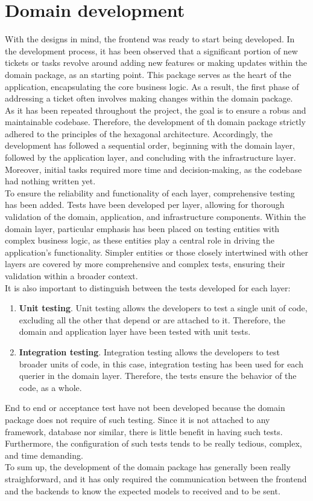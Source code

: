 \documentclass[./memory.tex]{subfiles}
\begin{document}
\section{Domain development}
With the designs in mind, the frontend was ready to start being developed. In
the development process, it has been observed that a significant portion of new
tickets or tasks revolve around adding new features or making updates within the
domain package, as an starting point. This package serves as the heart of the
application, encapsulating the core business logic. As a result, the first phase
of addressing a ticket often involves making changes within the domain package.
\\[8pt]
As it has been repeated throughout the project, the goal is to ensure a robus
and maintainable codebase. Therefore, the development of th domain package
strictly adhered to the principles of the hexagonal architecture. Accordingly,
the development has followed a sequential order, beginning with the domain
layer, followed by the application layer, and concluding with the infrastructure
layer.
\\
Moreover, initial tasks required more time and decision-making, as the
codebase had nothing written yet.
\\[8pt]
To ensure the reliability and functionality of each layer, comprehensive testing
has been added. Tests have been developed per layer, allowing for thorough
validation of the domain, application, and infrastructure components. Within the
domain layer, particular emphasis has been placed on testing entities with
complex business logic, as these entities play a central role in driving the
application's functionality. Simpler entities or those closely intertwined with
other layers are covered by more comprehensive and complex tests, ensuring their
validation within a broader context.
\\
It is also important to distinguish between the tests developed for each layer:
\begin{enumerate}[label = -]
	\item\textbf{Unit testing}. Unit testing allows the developers to test a
	single unit of code, excluding all the other that depend or are attached to
	it. Therefore, the domain and application layer have been tested with unit
	tests.
	\item\textbf{Integration testing}. Integration testing allows the developers
	to test broader units of code, in this case, integration testing has been
	used for each querier in the domain layer. Therefore, the tests ensure the
	behavior of the code, as a whole.
\end{enumerate}
End to end or acceptance test have not been developed because the domain package
does not require of such testing. Since it is not attached to any framework,
database nor similar, there is little benefit in having such tests. Furthermore,
the configuration of such tests tends to be really tedious, complex, and time
demanding.
\\[8pt]
To sum up, the development of the domain package has generally been really
straighforward, and it has only required the communication between the frontend
and the backends to know the expected models to received and to be sent.
\end{document}
